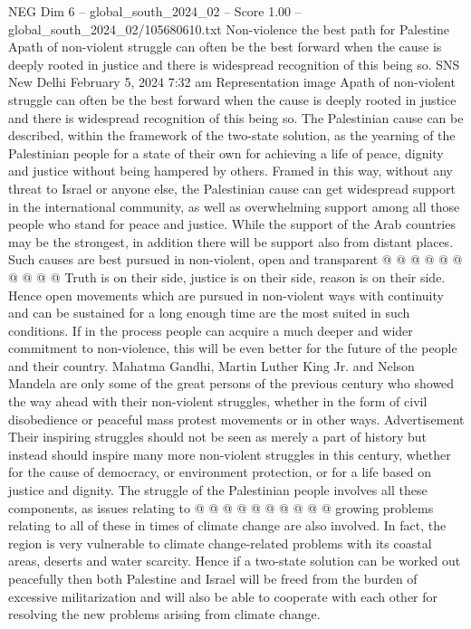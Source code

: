 \begin{textsample}{NEG Dim 6 – global\_south\_2024\_02 – Score 1.00 – global\_south\_2024\_02/105680610.txt}  \label{ex:f6_neg_283}
Non-violence the best path for Palestine Apath of non-violent struggle can often be the best forward when the cause is deeply rooted in justice and there is widespread recognition of this being so.
SNS New Delhi February 5, 2024 7:32 am Representation image Apath of non-violent struggle can often be the best forward when the cause is deeply rooted in justice and there is widespread recognition of this being so.
The Palestinian cause can be described, within the framework of the two-state solution, as the yearning of the Palestinian people for a state of their own for achieving a life of peace, dignity and justice without being hampered by others.
Framed in this way, without any threat to Israel or anyone else, the Palestinian cause can get widespread support in the international community, as well as overwhelming support among all those people who stand for peace and justice.
While the support of the Arab countries may be the strongest, in addition there will be support also from distant places.
Such causes are best pursued in non-violent, open and transparent @ @ @ @ @ @ @ @ @ @ Truth is on their side, justice is on their side, reason is on their side.
Hence open movements which are pursued in non-violent ways with continuity and can be sustained for a long enough time are the most suited in such conditions.
If in the process people can acquire a much deeper and wider commitment to non-violence, this will be even better for the future of the people and their country.
Mahatma Gandhi, Martin Luther King Jr. and Nelson Mandela are only some of the great persons of the previous century who showed the way ahead with their non-violent struggles, whether in the form of civil disobedience or peaceful mass protest movements or in other ways.
Advertisement Their inspiring struggles should not be seen as merely a part of history but instead should inspire many more non-violent struggles in this century, whether for the cause of democracy, or environment protection, or for a life based on justice and dignity.
The struggle of the Palestinian people involves all these components, as issues relating to @ @ @ @ @ @ @ @ @ @ growing problems relating to all of these in times of climate change are also involved.
In fact, the region is very vulnerable to climate change-related problems with its coastal areas, deserts and water scarcity.
Hence if a two-state solution can be worked out peacefully then both Palestine and Israel will be freed from the burden of excessive militarization and will also be able to cooperate with each other for resolving the new problems arising from climate change.

\end{textsample}
